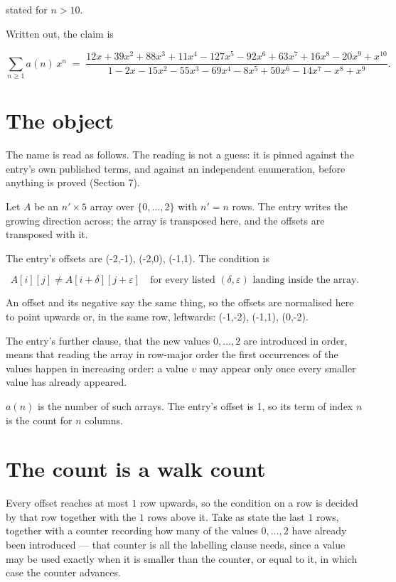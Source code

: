 \documentclass[11pt]{article}
\theoremstyle{definition}
\begin{document}
stated for $n > 10$.

Written out, the claim is

\[\sum_{n \ge 1} a(n)\,x^n \;=\; \frac{12x + 39x^{2} + 88x^{3} + 11x^{4} - 127x^{5} - 92x^{6} + 63x^{7} + 16x^{8} - 20x^{9} + x^{10}}{1 - 2x - 15x^{2} - 55x^{3} - 69x^{4} - 8x^{5} + 50x^{6} - 14x^{7} - x^{8} + x^{9}}.\]

\section{The object}

The name is read as follows. The reading is not a guess: it is pinned against the entry's own published terms, and against an independent enumeration, before anything is proved (Section 7).

Let $A$ be an $n' \times 5$ array over $\{0,\dots,2\}$ with $n' = n$ rows. The entry writes the growing direction across; the array is transposed here, and the offsets are transposed with it.

The entry's offsets are (-2,-1), (-2,0), (-1,1). The condition is

\[A[i][j] \ne A[i{+}\delta][j{+}\varepsilon]\quad\text{for every listed }(\delta,\varepsilon)\text{ landing inside the array.}\]

An offset and its negative say the same thing, so the offsets are normalised here to point upwards or, in the same row, leftwards: (-1,-2), (-1,1), (0,-2).

The entry's further clause, that the new values $0,\dots,2$ are introduced in order, means that reading the array in row-major order the first occurrences of the values happen in increasing order: a value $v$ may appear only once every smaller value has already appeared.

$a(n)$ is the number of such arrays. The entry's offset is 1, so its term of index $n$ is the count for $n$ columns.

\section{The count is a walk count}

Every offset reaches at most $1$ row upwards, so the condition on a row is decided by that row together with the $1$ rows above it. Take as state the last $1$ rows, together with a counter recording how many of the values $0,\dots,2$ have already been introduced --- that counter is all the labelling clause needs, since a value may be used exactly when it is smaller than the counter, or equal to it, in which case the counter advances.
\end{document}
